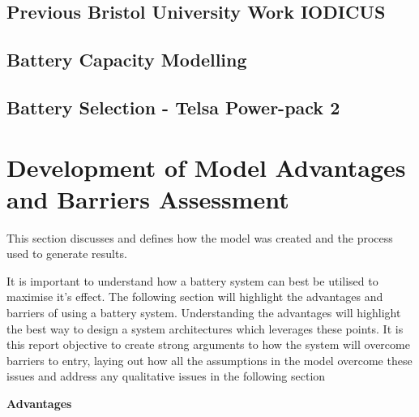 \subsection{Previous Bristol University Work
IODICUS}\label{previous-bristol-university-work-iodicus}

\subsection{Battery Capacity
Modelling}\label{battery-capacity-modelling}

\subsection{Battery Selection - Telsa Power-pack
2}\label{battery-selection---telsa-power-pack-2}

\newpage

\section{Development of Model Advantages and Barriers
Assessment}\label{development-of-model-advantages-and-barriers-assessment}

This section discusses and defines how the model was created and the
process used to generate results.

It is important to understand how a battery system can best be utilised
to maximise it's effect. The following section will highlight the
advantages and barriers of using a battery system. Understanding the
advantages will highlight the best way to design a system architectures
which leverages these points. It is this report objective to create
strong arguments to how the system will overcome barriers to entry,
laying out how all the assumptions in the model overcome these issues
and address any qualitative issues in the following section

\textbf{Advantages}

